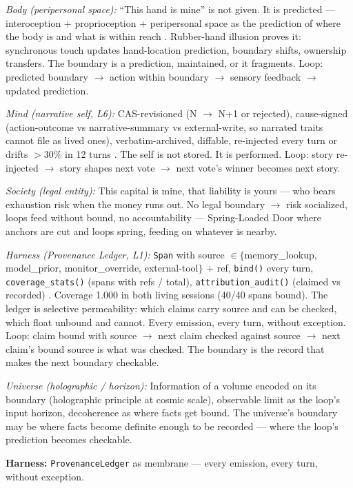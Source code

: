 \documentclass[11pt]{article}
\begin{document}
\textit{Body (peripersonal space):} ``This hand is mine'' is not given. It is predicted --- interoception + proprioception + peripersonal space as the prediction of where the body is and what is within reach \citep{seth2021}. Rubber-hand illusion proves it: synchronous touch updates hand-location prediction, boundary shifts, ownership transfers. The boundary is a prediction, maintained, or it fragments. Loop: predicted boundary $\to$ action within boundary $\to$ sensory feedback $\to$ updated prediction.

\textit{Mind (narrative self, L6):} CAS-revisioned (N $\to$ N+1 or rejected), cause-signed (action-outcome vs narrative-summary vs external-write, so narrated traits cannot file as lived ones), verbatim-archived, diffable, re-injected every turn or drifts $>$30\% in 12 turns \citep{choi2024}. The self is not stored. It is performed. Loop: story re-injected $\to$ story shapes next vote $\to$ next vote's winner becomes next story.

\textit{Society (legal entity):} This capital is mine, that liability is yours --- who bears exhaustion risk when the money runs out. No legal boundary $\to$ risk socialized, loops feed without bound, no accountability --- Spring-Loaded Door where anchors are cut and loops spring, feeding on whatever is nearby.

\textit{Harness (Provenance Ledger, L1):} \texttt{Span} with source $\in\{$memory\_lookup, model\_prior, monitor\_override, external-tool$\}$ + ref, \texttt{bind()} every turn, \texttt{coverage\_stats()} (spans with refs / total), \texttt{attribution\_audit()} (claimed vs recorded) \citep{gazzaniga2000,johansson2005}. Coverage 1.000 in both living sessions (40/40 spans bound). The ledger is selective permeability: which claims carry source and can be checked, which float unbound and cannot. Every emission, every turn, without exception. Loop: claim bound with source $\to$ next claim checked against source $\to$ next claim's bound source is what was checked. The boundary is the record that makes the next boundary checkable.

\textit{Universe (holographic / horizon):} Information of a volume encoded on its boundary (holographic principle \citep{maturana1980} at cosmic scale), observable limit as the loop's input horizon, decoherence as where facts get bound. The universe's boundary may be where facts become definite enough to be recorded --- where the loop's prediction becomes checkable.

\textbf{Harness:} \texttt{ProvenanceLedger} as membrane --- every emission, every turn, without exception.
\end{document}
